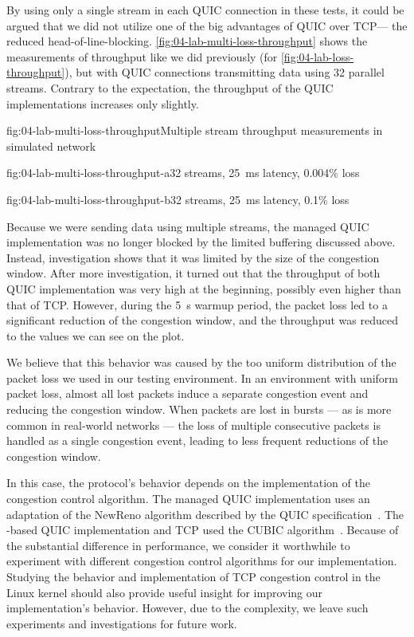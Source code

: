 By using only a single stream in each QUIC connection in these tests, it could be argued that we did
not utilize one of the big advantages of QUIC over TCP\@ --- the reduced \gls{head-of-line-blocking}.
\autoref{fig:04-lab-multi-loss-throughput} shows the measurements of throughput like we did
previously (for \autoref{fig:04-lab-loss-throughput}), but with QUIC connections transmitting data
using 32 parallel streams. Contrary to the expectation, the throughput of the QUIC implementations
increases only slightly.

\begin{myFigure}{fig:04-lab-multi-loss-throughput}{Multiple stream throughput measurements in simulated network}
\begin{mySubfigure}{0.49\linewidth}{fig:04-lab-multi-loss-throughput-a}{32 streams, \SI{25}{\milli\second} latency, 0.004\% loss}
\footnotesize

\end{mySubfigure}
\begin{mySubfigure}{0.49\linewidth}{fig:04-lab-multi-loss-throughput-b}{32 streams, \SI{25}{\milli\second} latency, 0.1\% loss}
\footnotesize

\end{mySubfigure}
\end{myFigure}

Because we were sending data using multiple streams, the managed QUIC implementation was no longer
blocked by the limited buffering discussed above. Instead, investigation shows that it was limited
by the size of the congestion window. After more investigation, it turned out that the throughput of
both QUIC implementation was very high at the beginning, possibly even higher than that of TCP\@.
However, during the \SI{5}{\second} warmup period, the packet loss led to a significant reduction of
the congestion window, and the throughput was reduced to the values we can see on the plot.

We believe that this behavior was caused by the too uniform distribution of the packet loss we used
in our testing environment. In an environment with uniform packet loss, almost all lost packets
induce a separate congestion event and reducing the congestion window. When packets are lost in
bursts --- as is more common in real-world networks --- the loss of multiple consecutive packets is
handled as a single congestion event, leading to less frequent reductions of the congestion window.

In this case, the protocol's behavior depends on the implementation of the congestion control
algorithm. The managed QUIC implementation uses an adaptation of the NewReno algorithm described by
the QUIC specification~\autocite[Section~7]{draft-ietf-quic-recovery}. The \libmsquic{}-based QUIC
implementation and TCP used the CUBIC algorithm~\cite{rfc8312}. Because of the substantial
difference in performance, we consider it worthwhile to experiment with different congestion control
algorithms for our implementation. Studying the behavior and implementation of TCP congestion
control in the Linux kernel should also provide useful insight for improving our implementation's
behavior. However, due to the complexity, we leave such experiments and investigations for future
work.

